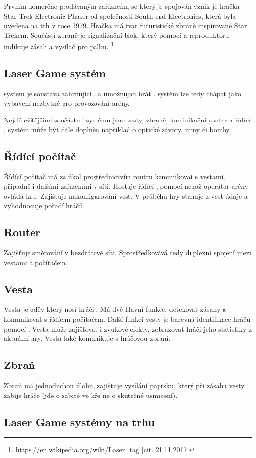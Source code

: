 Prvním komerčne prodávaným zařízneím, se který je spojován vznik  je hračka Star Trek Electronic Phaser od společnosti South end Electronics, která byla uvedena na trh v roce 1979. Hračka má tvar futuristické zbraně inspirované Star Trekem. Součástí zbraně je signalizační blok, který pomocí  a reproduktoru indikuje zásah a  vysílač pro palbu.
\footnote{\url{https://en.wikipedia.org/wiki/Laser_tag} [cit. 21.11.2017]}

\subsection{Laser Game systém}
 systém je soustava zahrnující ,  a  umožnující hrát .  systém lze tedy chápat jako vybavení nezbytné pro provozování  arény.

Nejdůležitějšími součástmi  systému jsou vesty, zbraně, kominikační router a řídící ,  systém může být dále doplněn například o optické závory, miny či bomby.

\subsection{Řídící počítač}
Řídící počítač má za úkol prostřednictvím routru komunikovat s vestami, případně i dalšími zařízeními v síti. Hostuje řídící , pomocí nehož operátor arény ovládá hru. Zajišťuje nakonfigurování vest. V průběhu hry stahuje z vest údaje a vyhodnocuje pořadí hráčů.

\subsection{Router}
Zajišťuje směrování v bezdrátové  síti. Sprostředkovává tedy duplexní spojení mezi vestami a počítačem.

\subsection{Vesta}
Vesta je oděv který nosí hráči . Má dvě hlavní funkce, detekovat zásahy a komunikovat s řídícím počítačem. Další funkcí vesty je barevná identifikace hráčů pomocí  . Vesta může zajišťovat i zvukové efekty, zobrazovat hráči jeho statistiky z aktuální hry. Vesta také komunikuje s hráčovou zbraní.

\subsection{Zbraň}
Zbraň má jednoduchou úlohu, zajištuje vysílání  paprsku, který při zásahu vesty zabije hráče (jde o zabité ve hře ne o skutečné usmrcení).

\subsection{Laser Game systémy na trhu}
